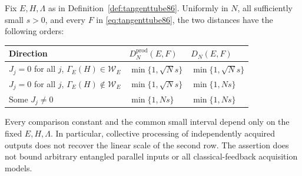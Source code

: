\begin{theorem}\label{thm:producttrichotomy86}
Fix $E,H,\Lambda$ as in Definition~\ref{def:tangenttube86}.  Uniformly
in $N$, all sufficiently small $s>0$, and every $F$ in
\eqref{eq:tangenttube86}, the two distances have the following orders:
\begin{center}
\begin{tabular}{@{}lll@{}}
\toprule
Direction & $D_N^{\mathrm{prod}}(E,F)$ & $D_N(E,F)$\\
\midrule
$J_j=0$ for all $j$, $\Gamma_E(H)\in\mathcal W_E$
 & $\min\{1,\sqrt N s\}$ & $\min\{1,\sqrt N s\}$\\
$J_j=0$ for all $j$, $\Gamma_E(H)\notin\mathcal W_E$
 & $\min\{1,\sqrt N s\}$ & $\min\{1,Ns\}$\\
Some $J_j\ne0$
 & $\min\{1,Ns\}$ & $\min\{1,Ns\}$\\
\bottomrule
\end{tabular}
\end{center}
Every comparison constant and the common small interval depend only
on the fixed $E,H,\Lambda$.  In particular, collective processing of
independently acquired outputs does not recover the linear scale of
the second row.  The assertion does not bound arbitrary entangled
parallel inputs or all classical-feedback acquisition models.
\end{theorem}
